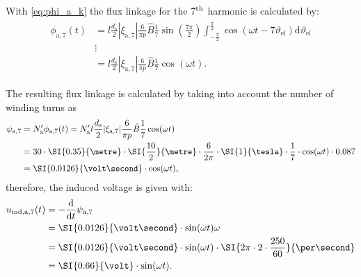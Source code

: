 \begin{solutionblock}
    With \eqref{eq:phi_a_k} the flux linkage for the $7\textsuperscript{th}$ harmonic is calculated by:
    \begin{align}
        \begin{split}
            \phi_{\mathrm{a,}7}(t) &= l \frac{d_{\mathrm{s}}}{2} |\xi_{\mathrm{a},7}|
            \frac{6}{\pi p} \hat{B}\frac{1}{7} \sin\left(\frac{7\pi}{2}\right) \int_{-\frac{\pi}{2}}^{\frac{\pi}{2}} \cos(\omega t - 7\vartheta_{\mathrm{el}}) \mathrm{d}\vartheta_{\mathrm{el}} \\
            &  \vdots \\
            &= l \frac{d_{\mathrm{s}}}{2} |\xi_{\mathrm{a},7}|
            \frac{6}{\pi p} \hat{B} \frac{1}{7} \cos(\omega t).
        \end{split}
    \end{align}

    The resulting flux linkage is calculated by taking into account the number of winding turns as
    \begin{align}
        \begin{split}
            \psi_{\mathrm{a,}7} &= N_{\mathrm{a}}' \phi_{\mathrm{a,}7}(t) 
            = N_{\mathrm{a}}' l \frac{d_{\mathrm{s}}}{2} |\xi_{\mathrm{a},7}| \frac{6}{\pi p} \hat{B} \frac{1}{7} \cos(\omega t) \\
            &= 30 \cdot \SI{0.35}{\metre} \cdot \SI{\frac{10}{2}}{\metre} \cdot \frac{6}{2\pi} \cdot \SI{1}{\tesla} \cdot \frac{1}{7} \cdot \cos(\omega t) \cdot 0.087 \\
            &= \SI{0.0126}{\volt\second} \cdot \cos(\omega t),
        \end{split}
    \end{align}
    therefore, the induced voltage is given with:
    \begin{align}
        \begin{split}
            u_{\mathrm{ind,a,}7}(t) &= -\frac{\mathrm{d}}{\mathrm{d}t}\psi_{\mathrm{a,}7} \\
            &= \SI{0.0126}{\volt\second} \cdot \sin(\omega t) \omega \\
            &= \SI{0.0126}{\volt\second} \cdot \sin(\omega t) \cdot \SI{2\pi\cdot 2\cdot \frac{250}{60}}{\per\second} \\
            &= \SI{0.66}{\volt} \cdot \sin(\omega t).
        \end{split}
    \end{align}
    
\end{solutionblock}



